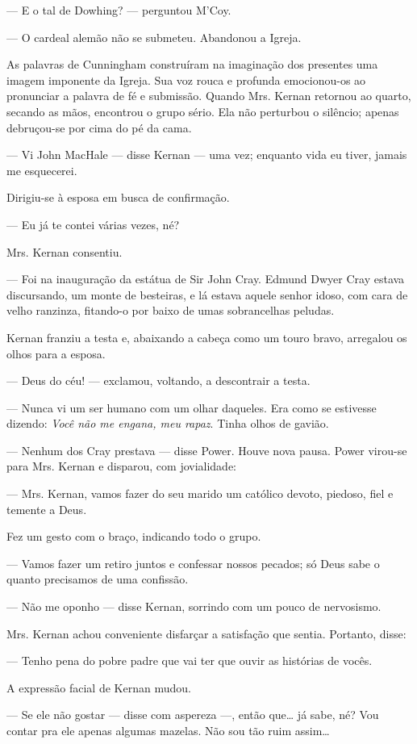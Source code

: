 --- E o tal de Dowhing? --- perguntou M'Coy.

--- O cardeal alemão não se submeteu. Abandonou a Igreja.

As palavras de Cunningham construíram na imaginação dos presentes
uma imagem imponente da Igreja. Sua voz rouca e profunda
emocionou-os ao pronunciar a palavra de fé e submissão. Quando
Mrs. Kernan retornou ao quarto, secando as mãos, encontrou o grupo
sério. Ela não perturbou o silêncio; apenas debruçou-se por cima do
pé da cama.

--- Vi John MacHale --- disse Kernan --- uma vez; enquanto vida eu
tiver, jamais me esquecerei.

Dirigiu-se à esposa em busca de confirmação.

--- Eu já te contei várias vezes, né?

Mrs. Kernan consentiu.

--- Foi na inauguração da estátua de Sir John Cray. Edmund Dwyer Cray
estava discursando, um monte de besteiras, e lá estava aquele senhor
idoso, com cara de velho ranzinza, fitando-o por baixo de umas
sobrancelhas peludas.

Kernan franziu a testa e, abaixando a cabeça como um touro bravo,
  arregalou os olhos para a esposa.

--- Deus do céu! --- exclamou, voltando, a descontrair a testa.

--- Nunca vi um ser humano com um olhar daqueles. Era como se
estivesse dizendo: \textit{Você não me engana, meu rapaz}. Tinha olhos de
gavião.

--- Nenhum dos Cray prestava --- disse Power. Houve nova pausa. Power
virou-se para Mrs. Kernan e disparou, com jovialidade:

--- Mrs. Kernan, vamos fazer do seu marido um católico devoto,
piedoso, fiel e temente a Deus.

Fez um gesto com o braço, indicando todo o grupo.

--- Vamos fazer um retiro juntos e confessar nossos pecados; só Deus
sabe o quanto precisamos de uma confissão.

--- Não me oponho --- disse Kernan, sorrindo com um pouco de
nervosismo.

Mrs. Kernan achou conveniente disfarçar a satisfação que sentia.
Portanto, disse:

--- Tenho pena do pobre padre que vai ter que ouvir as histórias de
vocês.

A expressão facial de Kernan mudou.

--- Se ele não gostar --- disse com aspereza ---, então que\ldots{} já
sabe, né? Vou contar pra ele apenas algumas mazelas. Não sou
tão ruim assim\ldots{}

